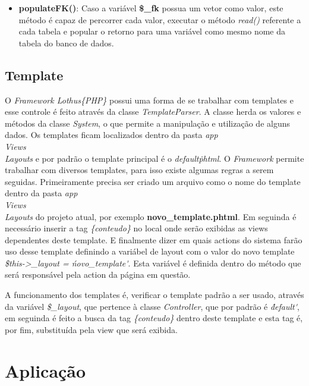 \begin{itemize}
                \item\textbf{populateFK()}: Caso a variável \textbf{\$\_fk} possua um vetor como valor, este método é capaz de percorrer cada valor, executar o método \emph{read()} referente a cada tabela e popular o retorno para uma variável como mesmo nome da tabela do banco de dados.

            \end{itemize}

        \subsection{Template\label{sub:system-template}}

            O \emph{Framework Lothus\{PHP\}} possui uma forma de se trabalhar com templates e esse controle é feito através da classe \emph{TemplateParser}. A classe herda os valores e métodos da classe \emph{System}, o que permite a manipulação e utilização de alguns dados. Os templates ficam localizados dentro da pasta \emph{app\\Views\\Layouts} e por padrão o template principal é o \emph{default\.phtml}. O \emph{Framework} permite trabalhar com diversos templates, para isso existe algumas regras a serem seguidas. Primeiramente precisa ser criado um arquivo como o nome do template dentro da pasta \emph{app\\Views\\Layouts} do projeto atual, por exemplo \textbf{novo\_template.phtml}. Em seguinda é necessário inserir a tag \emph{\{conteudo\}} no local onde serão exibidas as views dependentes deste template. E finalmente dizer em quais actions do sistema farão uso desse template definindo a variábel de layout com o valor do novo template \emph{\$this->\_layout = \'novo\_template\'}. Esta variável é definida dentro do método que será responsável pela action da página em questão.

            A funcionamento dos templates é, verificar o template padrão a ser usado, através da variável \emph{\$\_layout}, que pertence à classe \emph{Controller}, que por padrão é \emph{\'default\'}, em seguinda é feito a busca da tag \emph{\{conteudo\}} dentro deste template e esta tag é, por fim, substituída pela view que será exibida.


    \section{Aplicação\label{sec:app}}

